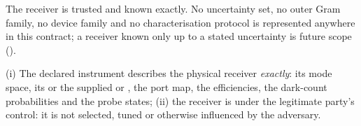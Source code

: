 
The receiver is trusted and known exactly. No uncertainty set, no outer Gram
family, no device family and no characterisation protocol is represented
anywhere in this contract; a receiver known only up to a stated uncertainty is
future scope ().

\begin{assumption}
\label{ass:trust}
(i) The declared instrument describes the physical receiver \emph{exactly}:
its mode space, its  or the supplied
 or , the
port map, the efficiencies, the dark-count probabilities and the probe states;
(ii) the receiver is under the legitimate party's control: it is not
selected, tuned or otherwise influenced by the adversary.
\end{assumption}
